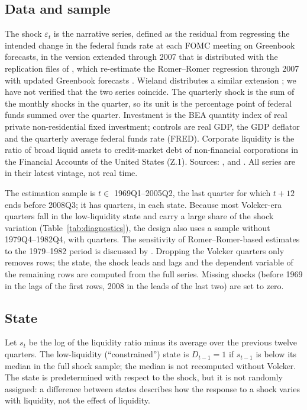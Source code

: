 \documentclass[11pt]{article}
\theoremstyle{remark}
\begin{document}
\subsection{Data and sample}

The shock $\varepsilon_t$ is the \citet{RomerRomer2004} narrative series, defined as the residual from regressing the intended
change in the federal funds rate at each FOMC meeting on Greenbook forecasts, in the version extended through 2007 that is
distributed with the replication files of \citet{Ramey2016}, which re-estimate the Romer--Romer regression through 2007 with
updated Greenbook forecasts \citep{WielandYang2020}. Wieland distributes a similar extension \citep{WielandRomerShocks2021}; we
have not verified that the two series coincide. The quarterly shock is the sum of the
monthly shocks in the quarter, so its unit is the percentage point of federal funds summed over the quarter. Investment is the
BEA quantity index of real private non-residential fixed investment; controls are real GDP, the GDP deflator and the quarterly
average federal funds rate (FRED). Corporate liquidity is the ratio of broad liquid assets to credit-market debt of non-financial
corporations in the Financial Accounts of the United States (Z.1). Sources: \citet{FRED2026}, \citet{BEA2026NonresInv} and \citet{FedZ12026}. All series are in their latest vintage, not real time.

The estimation sample is $t\in$ 1969Q1--2005Q2, the last quarter for which $t+12$ ends before 2008Q3; it has \NShockFull{}
quarters, \DiagFullDoneRestr{} in each state. Because most Volcker-era quarters fall in the low-liquidity state and carry a
large share of the shock variation (Table~\ref{tab:diagnostics}), the design also uses a sample without 1979Q4--1982Q4, with
\DiagNoVN{} quarters. The sensitivity of Romer--Romer-based estimates to the 1979--1982 period is discussed by
\citet{Coibion2012}. Dropping the Volcker quarters only removes rows; the state, the shock leads and lags and the dependent
variable of the remaining rows are computed from the full series. Missing shocks (before 1969 in the lags of the first rows,
2008 in the leads of the last two) are set to zero.

\subsection{State}

Let $s_t$ be the log of the liquidity ratio minus its average over the previous twelve quarters. The low-liquidity
(``constrained'') state is $D_{t-1}=1$ if $s_{t-1}$ is below its median in the full shock sample; the median is not recomputed
without Volcker. The state is predetermined with respect to the shock, but it is not randomly assigned: a difference between
states describes how the response to a shock varies with liquidity, not the effect of liquidity.
\end{document}
